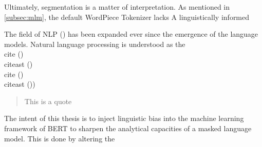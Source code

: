 \documentclass[english]{ttlab-qualify}
\begin{document}
    Ultimately, segmentation is a matter of interpretation.
    As mentioned in \ref{subsec:mlm}, the default WordPiece Tokenizer lacks
    A linguistically informed



    The field of NLP  (\cite{METZLER2016}) has been expanded ever since the emergence of the language models.
    Natural language processing is understood as the
    \\

    cite (\cite{METZLER2016})\\
    citeast (\cite*{METZLER2016})\\

    cite (\cite{DEEPL})\\
    citeast ()\cite*{DEEPL})\\

    \begin{quote}
        This is a quote
    \end{quote}
    The intent of this thesis is to inject linguistic bias into the machine learning framework of BERT to sharpen the analytical capacities of a masked language model.
    This is done by altering the
    \appendix
    \printbibliography
\end{document}
